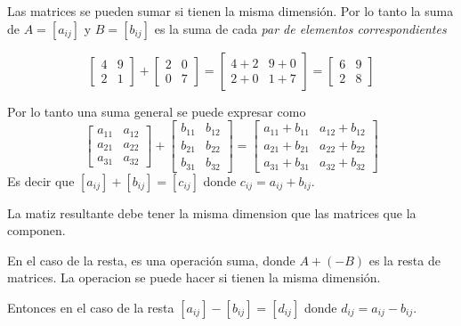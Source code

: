 Las matrices se pueden sumar si tienen la misma dimensión. Por lo tanto la suma de \(A = [a_{ij}]\) y \(B = [b_{ij}]\) es la suma de cada \textit{par de elementos correspondientes}
\begin{ejemplo}
    \[
    \begin{bmatrix}
        4 & 9 \\
        2 & 1
    \end{bmatrix}
    + 
    \begin{bmatrix}
        2 & 0 \\
        0 & 7 
    \end{bmatrix}
    = 
    \begin{bmatrix}
        4+2 & 9+0 \\
        2+0 & 1+7
    \end{bmatrix}
    = 
    \begin{bmatrix}
        6 & 9 \\
        2 & 8
    \end{bmatrix}
    \]
\end{ejemplo}
Por lo tanto una suma general se puede expresar como
\[
\begin{bmatrix}
    a_{11} & a_{12} \\
    a_{21} & a_{22} \\
    a_{31} & a_{32}
\end{bmatrix}
+
\begin{bmatrix}
    b_{11} & b_{12} \\
    b_{21} & b_{22} \\
    b_{31} & b_{32}    
\end{bmatrix}
= 
\begin{bmatrix}
    a_{11}+b_{11} & a_{12}+b_{12} \\
    a_{21}+b_{21} & a_{22}+b_{22} \\
    a_{31}+b_{31} & a_{32}+b_{32}
\end{bmatrix}
\]
Es decir que \([a_{ij}]+[b_{ij}]=[c_{ij}]\) donde \(c_{ij} = a_{ij} + b_{ij}\).

La matiz resultante debe tener la misma dimension que las matrices que la componen.

En el caso de la resta, es una operación suma, donde \(A + (-B)\) es la resta de matrices. La operacion se puede hacer si tienen la misma dimensión.

Entonces en el caso de la resta \([a_{ij}]-[b_{ij}]=[d_{ij}]\) donde \(d_{ij} = a_{ij} - b_{ij}\).

